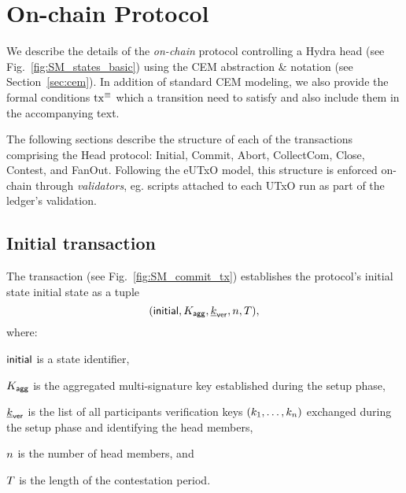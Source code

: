 \section{On-chain Protocol}\label{sec:mainchain}

We describe the details of the \emph{on-chain} protocol controlling a
Hydra head (see Fig.~\ref{fig:SM_states_basic}) using the CEM abstraction \&
notation (see Section~\ref{sec:cem}). In addition of standard CEM modeling, we
also provide the formal conditions $\mathrm{tx}^\equiv$ which a transition need to
satisfy and also include them in the accompanying text.

The following sections describe the structure of each of the transactions comprising 
the Head protocol: Initial, Commit, Abort, CollectCom, Close, Contest, and FanOut. 
Following the eUTxO model, this structure is enforced on-chain through \emph{validators}, eg. scripts attached to each UTxO run as part of the ledger's validation. 



\subsection{Initial transaction} 

The \mtxInit{} transaction (see
Fig.~\ref{fig:SM_commit_tx}) establishes the protocol's initial state
initial state as a tuple
$$
(\mathsf{initial},K_{\mathsf{agg}},\underline{k}_{\mathsf{ver}},n,T),
$$ 
where:
\begin{menumerate}
    \item $\mathsf{initial}$ is
a state identifier, 
   \item $K_{\mathsf{agg}}$ is the aggregated multi-signature key established
during the setup phase, 
  \item $\underline{k}_{\mathsf{ver}}$ is the list of all participants verification
keys $(k_1,\ldots,k_n)$ exchanged during the setup phase and identifying the
head members, 
  \item $n$ is the number of head members, and 
  \item $T$ is the length of the contestation period.
\end{menumerate} 

